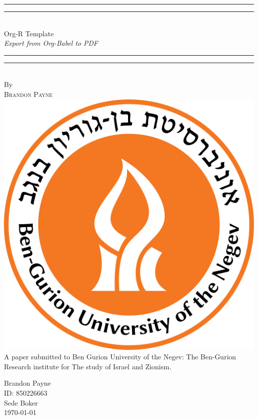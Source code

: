 %
\author{Brandon Payne}
%
\vspace*{13mm}
\begin{center}
\rule[0.5ex]{\linewidth}{2pt}\vspace*{-\baselineskip}\vspace*{3.2pt}
\rule[0.5ex]{\linewidth}{1pt}\\[\baselineskip]
{\Huge Org-R Template}\\[4mm]
{\Large \textit{Export from Org-Babel to PDF}}\\
\rule[0.5ex]{\linewidth}{1pt}\vspace*{-\baselineskip}\vspace{3.2pt}
\rule[0.5ex]{\linewidth}{2pt}\\
\vspace{6.5mm}
{\large By}\\
\vspace{6.5mm}
{\large\textsc{Brandon Payne}}\\
\vspace{11mm}
\includegraphics[scale=0.2]{bgu_logo}\\
\vspace{11mm}
A paper submitted to Ben Gurion University of the Negev: The Ben-Gurion Research institute for The study of Israel and Zionism.
\vspace{9mm}
{\large\textsc{}}
\vspace{12mm}
\end{center}
\begin{flushright}
{\Large Brandon Payne}\\
ID: 850226663\\
Sede Boker\\
{\large \today}
\end{flushright}
